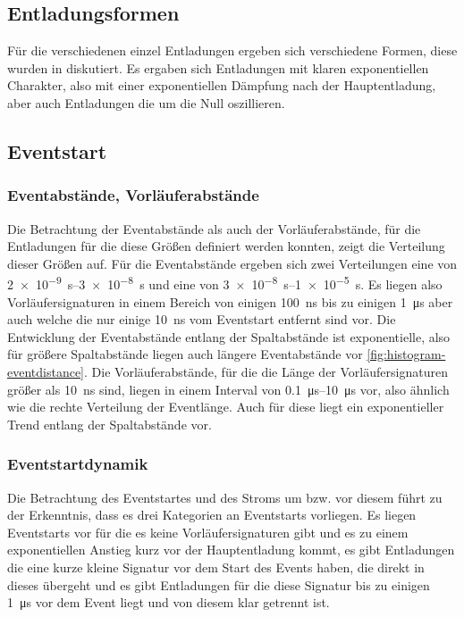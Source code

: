 \subsection{Entladungsformen}
Für die verschiedenen einzel Entladungen ergeben sich verschiedene Formen, diese wurden in  diskutiert. Es ergaben sich Entladungen mit klaren exponentiellen Charakter, also mit einer exponentiellen Dämpfung nach der Hauptentladung, aber auch Entladungen die um die Null oszillieren. 


\subsection{Eventstart}

\subsubsection{Eventabstände, Vorläuferabstände}
Die Betrachtung der Eventabstände als auch der Vorläuferabstände, für die Entladungen für die diese Größen definiert werden konnten, zeigt die Verteilung dieser Größen auf. Für die Eventabstände ergeben sich zwei Verteilungen eine von \SIrange{2e-9}{3e-8}{\second} und eine von \SIrange{3e-8}{1e-5}{\second}. Es liegen also Vorläufersignaturen in einem Bereich von einigen \SI{100}{\nano\second} bis zu einigen \SI{1}{\micro\second} aber auch welche die nur einige \SI{10}{\nano\second} vom Eventstart entfernt sind vor. Die Entwicklung der Eventabstände entlang der Spaltabstände ist exponentielle, also für größere Spaltabstände liegen auch längere Eventabstände vor \ref{fig:histogram-eventdistance}. Die Vorläuferabstände, für die die Länge der Vorläufersignaturen größer als \SI{10}{\nano\second} sind, liegen in einem Interval von \SIrange{0,1}{10}{\micro\second} vor, also ähnlich wie die rechte Verteilung der Eventlänge. Auch für diese liegt ein exponentieller Trend entlang der Spaltabstände vor. 

\subsubsection{Eventstartdynamik}
Die Betrachtung des Eventstartes und des Stroms um bzw. vor diesem führt zu der Erkenntnis, dass es drei Kategorien an Eventstarts vorliegen. Es liegen Eventstarts vor für die es keine Vorläufersignaturen gibt und es zu einem exponentiellen Anstieg kurz vor der Hauptentladung kommt, es gibt Entladungen die eine kurze kleine Signatur vor dem Start des Events haben, die direkt in dieses übergeht und es gibt Entladungen für die diese Signatur bis zu einigen \SI{1}{\micro\second} vor dem Event liegt und von diesem klar getrennt ist. 

